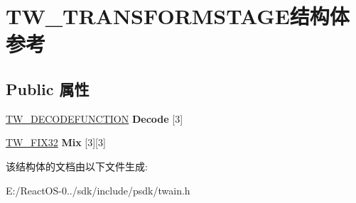 \hypertarget{struct_t_w___t_r_a_n_s_f_o_r_m_s_t_a_g_e}{}\section{T\+W\+\_\+\+T\+R\+A\+N\+S\+F\+O\+R\+M\+S\+T\+A\+G\+E结构体 参考}
\label{struct_t_w___t_r_a_n_s_f_o_r_m_s_t_a_g_e}
\subsection*{Public 属性}
\begin{DoxyCompactItemize}
\item 
\mbox{\label{struct_t_w___t_r_a_n_s_f_o_r_m_s_t_a_g_e_a4330da3a5f2315cb3744983ad84a79a1}} 
\hyperlink{struct_t_w___d_e_c_o_d_e_f_u_n_c_t_i_o_n}{T\+W\+\_\+\+D\+E\+C\+O\+D\+E\+F\+U\+N\+C\+T\+I\+ON} {\bfseries Decode} \mbox{[}3\mbox{]}
\item 
\mbox{\label{struct_t_w___t_r_a_n_s_f_o_r_m_s_t_a_g_e_a41301f4c3cf2c085944c25a676fce77a}} 
\hyperlink{struct_t_w___f_i_x32}{T\+W\+\_\+\+F\+I\+X32} {\bfseries Mix} \mbox{[}3\mbox{]}\mbox{[}3\mbox{]}
\end{DoxyCompactItemize}


该结构体的文档由以下文件生成\+:\begin{DoxyCompactItemize}
\item 
E\+:/\+React\+O\+S-\/0../sdk/include/psdk/twain.\+h\end{DoxyCompactItemize}
